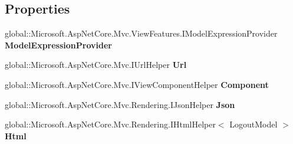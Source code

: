 \subsection*{Properties}
\begin{DoxyCompactItemize}
\item 
\mbox{\label{class_projeto_e_s_w_1_1_areas_1_1_identity_1_1_pages_1_1_account_1_1_areas___identity___pages___account___logout_ab489dfef33d6bcb58010644b6abbee70}} 
global\+::\+Microsoft.\+Asp\+Net\+Core.\+Mvc.\+View\+Features.\+I\+Model\+Expression\+Provider {\bfseries Model\+Expression\+Provider}
\item 
\mbox{\label{class_projeto_e_s_w_1_1_areas_1_1_identity_1_1_pages_1_1_account_1_1_areas___identity___pages___account___logout_af0ddb1f9158adfecf3819d0a151d76c7}} 
global\+::\+Microsoft.\+Asp\+Net\+Core.\+Mvc.\+I\+Url\+Helper {\bfseries Url}
\item 
\mbox{\label{class_projeto_e_s_w_1_1_areas_1_1_identity_1_1_pages_1_1_account_1_1_areas___identity___pages___account___logout_a6fd22eac418e92112cc2f2b10b4c9446}} 
global\+::\+Microsoft.\+Asp\+Net\+Core.\+Mvc.\+I\+View\+Component\+Helper {\bfseries Component}
\item 
\mbox{\label{class_projeto_e_s_w_1_1_areas_1_1_identity_1_1_pages_1_1_account_1_1_areas___identity___pages___account___logout_aacda8b7cb5aa51d39c621729684692ac}} 
global\+::\+Microsoft.\+Asp\+Net\+Core.\+Mvc.\+Rendering.\+I\+Json\+Helper {\bfseries Json}
\item 
\mbox{\label{class_projeto_e_s_w_1_1_areas_1_1_identity_1_1_pages_1_1_account_1_1_areas___identity___pages___account___logout_aac224ee85eb232019992bdc31ec46024}} 
global\+::\+Microsoft.\+Asp\+Net\+Core.\+Mvc.\+Rendering.\+I\+Html\+Helper$<$ Logout\+Model $>$ {\bfseries Html}
\end{DoxyCompactItemize}


